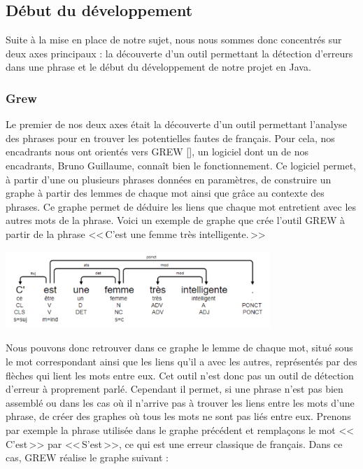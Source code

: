 \documentclass[11pt]{article}
\begin{document}
\subsection{D\'{e}but du d\'{e}veloppement}
Suite \`{a} la mise en place de notre sujet, nous nous sommes donc concentr\'{e}s sur deux axes principaux : la d\'{e}couverte d'un outil permettant la d\'{e}tection d'erreurs dans une phrase et le d\'{e}but du d\'{e}veloppement de notre projet en Java.

\subsubsection{Grew}
Le premier de nos deux axes \'{e}tait la d\'{e}couverte d'un outil permettant l'analyse des phrases pour en trouver les potentielles fautes de fran\c{c}ais. Pour cela, nos encadrants nous ont orient\'{e}s vers GREW [\cite[2]{2}], un logiciel dont un de nos encadrants, Bruno Guillaume, conna\^{i}t bien le fonctionnement. Ce logiciel permet, \`{a} partir d'une ou plusieurs phrases donn\'{e}es en param\`{e}tres, de construire un graphe \`{a} partir des lemmes de chaque mot ainsi que gr\^{a}ce au contexte des phrases. Ce graphe permet de d\'{e}duire les liens que chaque mot entretient avec les autres mots de la phrase. Voici un exemple de graphe que cr\'{e}e l'outil GREW \`{a} partir de la phrase <<\,C'est une femme tr\`{e}s intelligente.\,>>

\begin{center}
\includegraphics[width=10cm]{graphgrew.png} %
\end{center}

Nous pouvons donc retrouver dans ce graphe le lemme de chaque mot, situ\'{e} sous le mot correspondant ainsi que les liens qu'il a avec les autres, repr\'{e}sent\'{e}s par des fl\`{e}ches qui lient les mots entre eux. Cet outil n'est donc pas un outil de d\'{e}tection d'erreur \`{a} proprement parl\'{e}. Cependant il permet, si une phrase n'est pas bien assembl\'{e} ou dans les cas o\`{u} il n'arrive pas \`{a} trouver les liens entre les mots d'une phrase, de cr\'{e}er des graphes o\`{u} tous les mots ne sont pas li\'{e}s entre eux. Prenons par exemple la phrase utilis\'{e}e dans le graphe pr\'{e}c\'{e}dent et rempla\c{c}ons le mot <<\,C'est\,>> par <<\,S'est\,>>, ce qui est une erreur classique de fran\c{c}ais. Dans ce cas, GREW r\'{e}alise le graphe suivant :
\end{document}
